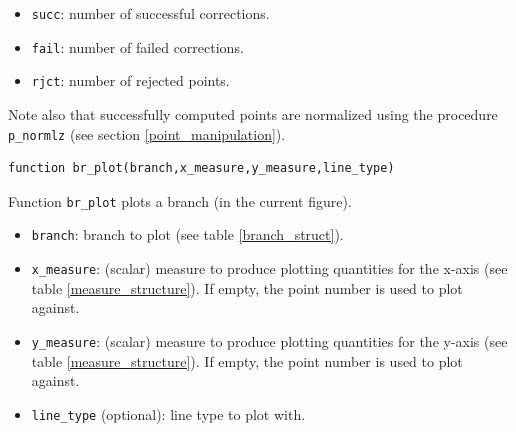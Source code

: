 \documentclass[10pt]{scrartcl}
\newcommand{\blist}[1]{\mbox{\lstinline!#1!}}
\begin{document}
{\begin{itemize}
initial branch). 
\item \blist{succ}: number of successful corrections.
\item \blist{fail}: number of failed corrections.
\item \blist{rjct}: number of rejected points.
\end{itemize}
Note also that successfully computed points are normalized using the procedure
\blist{p_normlz} (see section \ref{point_manipulation}). 
\begin{lstlisting}
function br_plot(branch,x_measure,y_measure,line_type)  
\end{lstlisting}
\noindent Function \blist{br_plot} plots a branch (in the current figure). 
\begin{itemize}
\item \blist{branch}: branch to plot (see table \ref{branch_struct}).
\item \blist{x_measure}: (scalar) measure to produce plotting quantities
for the x-axis (see table \ref{measure_structure}). 
If empty, the point number is used to plot against.
\item \blist{y_measure}: (scalar) measure to produce plotting quantities
for the y-axis (see table \ref{measure_structure}). 
If empty, the point number is used to plot against.
\item \blist{line_type} (optional): line type to plot with.
\end{itemize}

}
\end{document}
